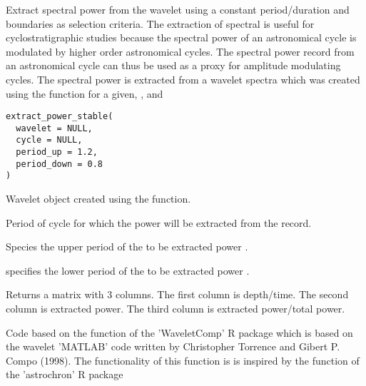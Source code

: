 \documentclass[a4paper]{book}
\begin{document}
%
\begin{Description}
Extract spectral power from the wavelet using a constant period/duration and
boundaries as selection criteria. The extraction of spectral is useful for cyclostratigraphic studies because the spectral power of an
astronomical cycle is modulated by higher order astronomical cycles.
The spectral power record from an astronomical cycle can thus be used as a proxy for
amplitude modulating cycles. The spectral power is extracted from a wavelet spectra
which was created using the 
function for a given, ,  and 
\end{Description}
%
\begin{Usage}
\begin{verbatim}
extract_power_stable(
  wavelet = NULL,
  cycle = NULL,
  period_up = 1.2,
  period_down = 0.8
)
\end{verbatim}
\end{Usage}
%
\begin{Arguments}
\begin{ldescription}
\item[\code{wavelet}] Wavelet object created using the  function.

\item[\code{cycle}] Period of cycle for which the power will be extracted from the record.

\item[\code{period\_up}] Species the upper period of the to be extracted power .

\item[\code{period\_down}] specifies the lower period of the to be extracted power .
\end{ldescription}
\end{Arguments}
%
\begin{Value}
Returns a matrix with 3 columns.
The first column is depth/time.
The second column is extracted power.
The third column is extracted power/total power.
\end{Value}
%
\begin{Author}
Code based on the  function of the 'WaveletComp' R package
which is based on the wavelet 'MATLAB' code written by Christopher Torrence and Gibert P. Compo (1998).
The functionality of this function is is inspired by the
 function of the 'astrochron' R package
\end{Author}
\end{document}
